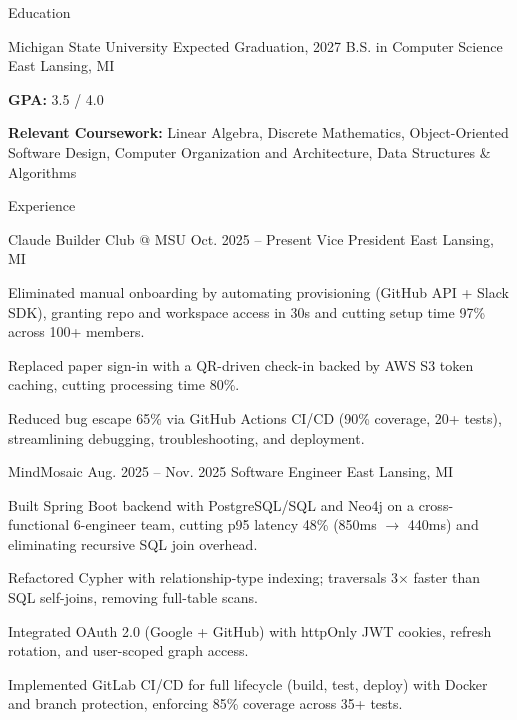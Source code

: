 \documentclass[
	11pt
]{../../../resume}
\begin{document}
	\begin{rSection}{E}{ducation}
		\begin{rSectionEntry}
			{Michigan State University}
			{Expected Graduation, 2027}
			{B.S. in Computer Science}
			{}
			{East Lansing, MI}

			\item \textbf{GPA:} 3.5 / 4.0
			\item \textbf{Relevant Coursework:} Linear Algebra, Discrete Mathematics, Object-Oriented Software Design, Computer Organization and Architecture, Data Structures \& Algorithms
		\end{rSectionEntry}
	\end{rSection}

	\begin{rSection}{E}{xperience}
		\begin{rSectionEntry}
			{Claude Builder Club @ MSU}
			{Oct. 2025 -- Present}
			{Vice President}
			{}
			{East Lansing, MI}

			\item Eliminated manual onboarding by automating provisioning (GitHub API + Slack SDK), granting repo and workspace access in 30s and cutting setup time 97\% across 100+ members.
			\item Replaced paper sign-in with a QR-driven check-in backed by AWS S3 token caching, cutting processing time 80\%.
			\item Reduced bug escape 65\% via GitHub Actions CI/CD (90\% coverage, 20+ tests), streamlining debugging, troubleshooting, and deployment.
		\end{rSectionEntry}

		\begin{rSectionEntry}
			{MindMosaic}
			{Aug. 2025 -- Nov. 2025}
			{Software Engineer}
			{}
			{East Lansing, MI}

			\item Built Spring Boot backend with PostgreSQL/SQL and Neo4j on a cross-functional 6-engineer team, cutting p95 latency 48\% (850ms $\rightarrow$ 440ms) and eliminating recursive SQL join overhead.
			\item Refactored Cypher with relationship-type indexing; traversals 3$\times$ faster than SQL self-joins, removing full-table scans.
			\item Integrated OAuth 2.0 (Google + GitHub) with httpOnly JWT cookies, refresh rotation, and user-scoped graph access.
			\item Implemented GitLab CI/CD for full lifecycle (build, test, deploy) with Docker and branch protection, enforcing 85\% coverage across 35+ tests.
		\end{rSectionEntry}
	\end{rSection}
\end{document}
